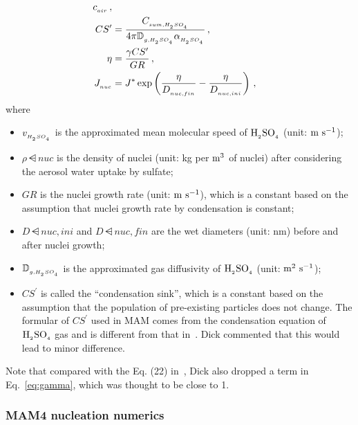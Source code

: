 \begin{itemize}
\begin{align}
                                             {c_{_{air}}} \,, \\
CS^\prime &= \frac{C_{_{sum,H_{_2}SO_{_4}}}}
                  {4 \pi \mathbb{D}_{_{g,H_{_2}SO_{_4}}} \alpha_{_{H_{_2}SO_{_4}}}} \,, \label{eq:cs_prime} \\
\eta &= \frac{\gamma CS^\prime}{GR} \,, \\
J_{_{nuc}} &= J^* \exp \left( \frac{\eta}{D_{_{nuc,fin}}} -
                         \frac{\eta}{D_{_{nuc,ini}}} \right) \,,
\end{align}
%
where
\begin{itemize}
\item $v_{_{H_{_2}SO_{_4}}}$ is the approximated mean molecular speed of
$\rm H_{_2}SO_{_4}$ (unit: $\rm m~s^{-1}$);
\item $\rho\dsub{nuc}$ is the density of nuclei (unit: kg per $\rm m^3$
of nuclei) after considering the aerosol water uptake by sulfate;
\item $GR$ is the nuclei growth rate (unit: $\rm m~s^{-1}$), which
is a constant based on the assumption that nuclei growth rate by
condensation is constant;
\item $D\dsub{nuc,ini}$ and $D\dsub{nuc,fin}$ are the wet diameters
(unit: nm) before and after nuclei growth;
\item $\mathbb{D}_{_{g,H_{_2}SO_{_4}}}$ is the approximated gas diffusivity
of $\rm H_{_2}SO_{_4}$ (unit: $\rm m^2~s^{-1}$);
\item $CS^\prime$ is called the ``condensation sink'', which is
a constant based on the assumption that the population of
pre-existing particles does not change. The formular of $CS^\prime$
used in MAM comes from the condensation equation of $\rm H_{_2}SO_{_4}$ gas and
is different from that in~\cite{kerminen-2002-jas}. Dick commented
that this would lead to minor difference.
\end{itemize}
Note that compared with the Eq. (22) in~\cite{kerminen-2002-jas},
Dick also dropped a term in Eq.~\eqref{eq:gamma}, which was
thought to be close to 1.
\end{itemize}

\subsubsection{MAM4 nucleation numerics}

